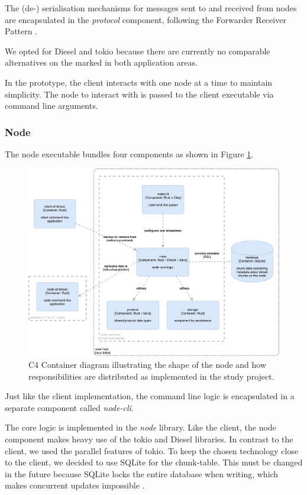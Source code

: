 The (de-) serialisation mechanisms for messages sent to and received from \glspl{node} are encapsulated in the \emph{protocol} component, following the Forwarder Receiver Pattern \cite{POSA1}.

We opted for Diesel and tokio because there are currently no comparable alternatives on the marked in both application areas.

In the prototype, the \gls{client} interacts with one \gls{node} at a time to maintain simplicity. The \gls{node} to interact with is passed to the \gls{client} executable via command line arguments.

\subsubsection{Node}

The \gls{node} executable bundles four components as shown in Figure \ref{fig:c4-node-container}.  

\begin{figure}[h]
	\centering
	\includegraphics[width=1\linewidth]{resources/c4-node-container}
	\caption[Node specific C4 Container diagram]{C4 Container diagram illustrating the shape of the \gls{node} and how responsibilities are distributed as implemented in the study project.}
	\label{fig:c4-node-container}
\end{figure}

Just like the \gls{client} implementation, the command line logic is encapsulated in a separate component called \emph{node-cli}.

The core logic is implemented in the \emph{node} library. Like the \gls{client}, the \gls{node} component makes heavy use of the tokio and Diesel libraries. In contrast to the client, we used the parallel features of tokio. To keep the chosen technology close to the client, we decided to use SQLite for the \gls{chunk-table}. This must be changed in the future because SQLite locks the entire database when writing, which makes concurrent updates impossible \cite{sqlite-locking}.

